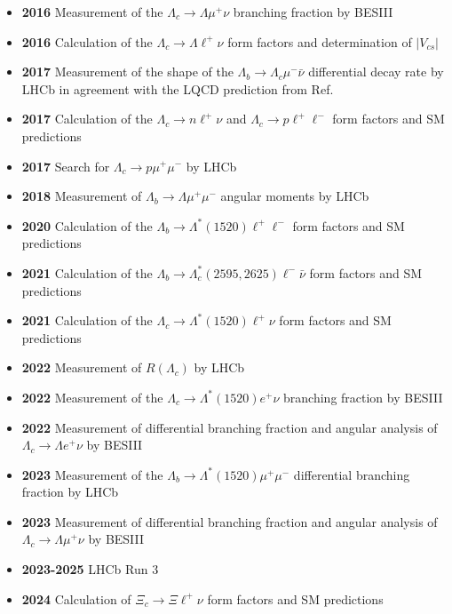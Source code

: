 \documentclass[12pt,hyperpdf]{article}
\begin{document}
\begin{itemize}
\begin{itemize}
   \item{\bf 2016} Measurement of the $\Lambda_c \to \Lambda \mu^+\nu$ branching fraction by BESIII \cite{Ablikim:2016vqd}
   \item{\bf 2016} Calculation of the $\Lambda_c \to \Lambda \ell^+\nu$ form factors and determination of $|V_{cs}|$ \cite{Meinel:2016dqj}
   \item{\bf 2017} Measurement of the shape of the $\Lambda_b\to\Lambda_c \mu^- \bar{\nu}$ differential decay rate by LHCb \cite{Aaij:2017svr} in agreement with the LQCD prediction from Ref.~\cite{Detmold:2015aaa}
   \item{\bf 2017} Calculation of the $\Lambda_c \to n \ell^+\nu$ and $\Lambda_c \to p \ell^+\ell^-$ form factors and SM predictions \cite{Meinel:2017ggx}
   \item{\bf 2017} Search for $\Lambda_c \to p \mu^+\mu^-$ by LHCb \cite{Aaij:2017nsd}
   \item{\bf 2018} Measurement of $\Lambda_b \to \Lambda \mu^+\mu^-$ angular moments by LHCb \cite{Aaij:2018gwm}
   \item{\bf 2020} Calculation of the $\Lambda_b \to \Lambda^*(1520) \ell^+\ell^-$ form factors and SM predictions \cite{Meinel:2020owd}
   \item{\bf 2021} Calculation of the $\Lambda_b \to \Lambda_c^*(2595,2625)\ell^-\bar{\nu}$ form factors and SM predictions \cite{Meinel:2021rbm}
   \item{\bf 2021} Calculation of the $\Lambda_c \to \Lambda^*(1520) \ell^+\nu$ form factors and SM predictions \cite{Meinel:2021mdj,Meinel:2021grq}
   \item{\bf 2022} Measurement of $R(\Lambda_c)$ by LHCb \cite{LHCb:2022piu}
   \item{\bf 2022} Measurement of the $\Lambda_c \to \Lambda^*(1520) e^+\nu$ branching fraction by BESIII \cite{BESIII:2022qaf}
   \item{\bf 2022} Measurement of differential branching fraction and angular analysis of $\Lambda_c \to \Lambda e^+\nu$ by BESIII \cite{BESIII:2022ysa}
   \item{\bf 2023} Measurement of the $\Lambda_b \to \Lambda^*(1520) \mu^+\mu^-$ differential branching fraction by LHCb \cite{LHCb:2023ptw}
   \item{\bf 2023} Measurement of differential branching fraction and angular analysis of $\Lambda_c \to \Lambda \mu^+\nu$ by BESIII \cite{BESIII:2023jxv}
   \item{\bf 2023-2025} LHCb Run 3
   \item{\bf 2024} Calculation of $\Xi_c\to\Xi\ell^+\nu$ form factors and SM predictions

\end{itemize}
\end{itemize}
\end{document}
